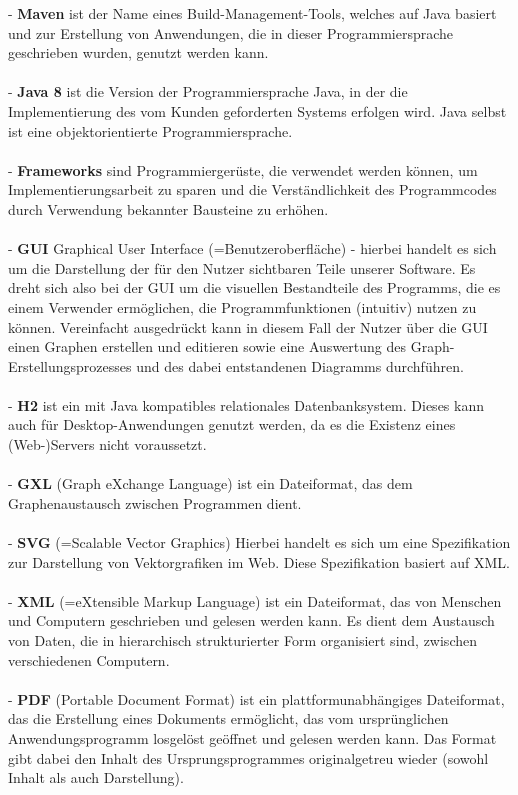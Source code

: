 \documentclass[enabledeprecatedfontcommands,fontsize=11pt,paper=a4,twoside]{scrartcl}
\newcounter{one}
\begin{document}
- \textbf{Maven} ist der Name eines Build-Management-Tools, welches auf Java basiert und zur Erstellung von Anwendungen, die in dieser Programmiersprache geschrieben wurden, genutzt werden kann. \\ \\
- \textbf{Java 8} ist die Version der Programmiersprache Java, in der die Implementierung des vom Kunden geforderten Systems erfolgen wird. Java selbst ist eine objektorientierte Programmiersprache. \\ \\
- \textbf{Frameworks} sind Programmiergerüste, die verwendet werden können, um Implementierungsarbeit zu sparen und die Verständlichkeit des Programmcodes durch Verwendung bekannter Bausteine zu erhöhen. \\ \\
- \textbf{GUI} Graphical User Interface (=Benutzeroberfläche) - hierbei handelt es sich um die Darstellung der für den Nutzer sichtbaren Teile unserer Software. Es dreht sich also bei der GUI um die visuellen Bestandteile des Programms, die es einem Verwender ermöglichen, die Programmfunktionen (intuitiv) nutzen zu können. Vereinfacht ausgedrückt kann in diesem Fall der Nutzer über die GUI einen Graphen erstellen und editieren sowie eine Auswertung des Graph-Erstellungsprozesses und des dabei entstandenen Diagramms durchführen. \\ \\
- \textbf{H2} ist ein mit Java kompatibles relationales Datenbanksystem. Dieses kann auch für Desktop-Anwendungen genutzt werden, da es die Existenz eines (Web-)Servers nicht voraussetzt.\\ \\
- \textbf{GXL} (Graph eXchange Language) ist ein Dateiformat, das dem Graphenaustausch zwischen Programmen dient. \\ \\
- \textbf{SVG} (=Scalable Vector Graphics) Hierbei handelt es sich um eine Spezifikation zur Darstellung von Vektorgrafiken im Web. Diese Spezifikation basiert auf XML.  \\ \\
- \textbf{XML} (=eXtensible Markup Language) ist ein Dateiformat, das von Menschen und Computern geschrieben und gelesen werden kann. Es dient dem Austausch von Daten, die in hierarchisch strukturierter Form organisiert sind, zwischen verschiedenen Computern. \\ \\
- \textbf{PDF} (Portable Document Format) ist ein plattformunabhängiges Dateiformat, das die Erstellung eines Dokuments ermöglicht, das vom ursprünglichen Anwendungsprogramm losgelöst geöffnet und gelesen werden kann. Das Format gibt dabei den Inhalt des Ursprungsprogrammes originalgetreu wieder (sowohl Inhalt als auch Darstellung). \\ \\
\end{document}
